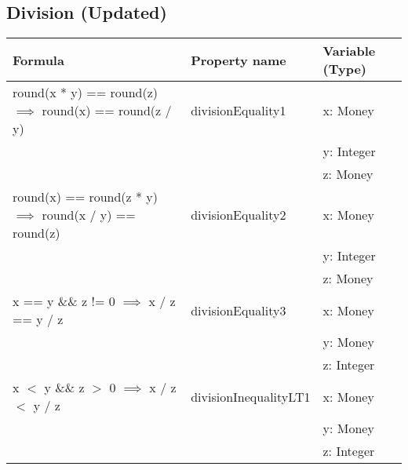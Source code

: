 \subsection*{Division (Updated)}
\label{ssct:properties_division_updated}
\begin{table}[!ht]
\centering
\begin{tabular}{lll}
\hline
                        \textbf{Formula}                                             & \textbf{Property name} & \textbf{Variable (Type)} \\ \hline
\rowcolor[HTML]{EFEFEF} round(x * y) == round(z) $\implies$ round(x) == round(z / y) & divisionEquality1      & x: Money                 \\
\rowcolor[HTML]{EFEFEF}                                                              &                        & y: Integer               \\
\rowcolor[HTML]{EFEFEF}                                                              &                        & z: Money                 \\
                        round(x) == round(z * y) $\implies$ round(x / y) == round(z) & divisionEquality2      & x: Money                 \\
                                                                                     &                        & y: Integer               \\
                                                                                     &                        & z: Money                 \\
\rowcolor[HTML]{EFEFEF} x == y \&\& z != 0 $\implies$ x / z == y / z                 & divisionEquality3      & x: Money                 \\
\rowcolor[HTML]{EFEFEF}                                                              &                        & y: Money                 \\
\rowcolor[HTML]{EFEFEF}                                                              &                        & z: Integer               \\
												x $<$ y \&\& z $>$ 0 $\implies$ x / z $<$ y / z              & divisionInequalityLT1  & x: Money                 \\
																																										 &                        & y: Money                 \\
																																										 &                        & z: Integer               \\

\end{tabular}
\end{table}
